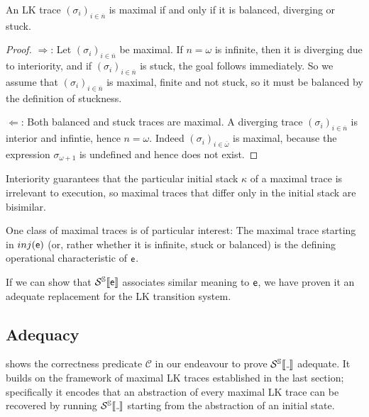 \begin{lemma}
  An LK trace $(σ_i)_{i∈\overline{n}}$ is maximal if and only if it is balanced,
  diverging or stuck.
\end{lemma}
\begin{proof}
  $\Rightarrow$: Let $(σ_i)_{i∈\overline{n}}$ be maximal.
  If $n=ω$ is infinite, then it is diverging due to interiority, and if
  $(σ_i)_{i∈\overline{n}}$ is stuck, the goal follows immediately.
  So we assume that $(σ_i)_{i∈\overline{n}}$ is maximal, finite and not stuck,
  so it must be balanced by the definition of stuckness.

  $\Leftarrow$: Both balanced and stuck traces are maximal.
  A diverging trace $(σ_i)_{i∈\overline{n}}$ is interior and infintie,
  hence $n=ω$.
  Indeed $(σ_i)_{i∈\overline{ω}}$ is maximal, because the expression $σ_{ω+1}$
  is undefined and hence does not exist.
\end{proof}

Interiority guarantees that the particular initial stack $κ$ of a maximal trace
is irrelevant to execution, so maximal traces that differ only in the initial
stack are bisimilar.

One class of maximal traces is of particular interest:
The maximal trace starting in $inj(\mathsf{e})$ (or, rather whether it is infinite,
stuck or balanced) is the defining operational characteristic of $\mathsf{e}$.

If we can show that $\mathcal{S}^{\mathbb{S}}\llbracket {\mathsf{e}} \rrbracket$ associates similar meaning to $\mathsf{e}$, we have
proven it an adequate replacement for the LK transition system.

\subsection{Adequacy}

 shows the correctness predicate $\mathcal{C}$ in
our endeavour to prove $\semst{\wild}$ adequate.
It builds on the framework of maximal LK traces established in the last section;
specifically it encodes that an abstraction of every maximal LK trace can be
recovered by running $\semst{\wild}$ starting from the abstraction of an initial
state.

